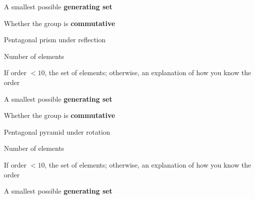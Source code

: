 \documentclass[../gatm_answers.tex]{subfiles}
\begin{document}
\begin{inner_problem}
\item A smallest possible \textbf{generating set}
\end{inner_problem}

\begin{inner_problem}
\item Whether the group is \textbf{commutative}
\end{inner_problem}

\begin{outer_problem}
\item Pentagonal prism under reflection
\end{outer_problem}

\begin{inner_problem}[start=1]
\item Number of elements
\end{inner_problem}

\begin{inner_problem}
\item If order $< 10$, the set of elements; otherwise, an explanation of how you know the order
\end{inner_problem}

\begin{inner_problem}
\item A smallest possible \textbf{generating set}
\end{inner_problem}

\begin{inner_problem}
\item Whether the group is \textbf{commutative}
\end{inner_problem}

\begin{outer_problem}
\item Pentagonal pyramid under rotation
\end{outer_problem}

\begin{inner_problem}[start=1]
\item Number of elements
\end{inner_problem}

\begin{inner_problem}
\item If order $< 10$, the set of elements; otherwise, an explanation of how you know the order
\end{inner_problem}

\begin{inner_problem}
\item A smallest possible \textbf{generating set}
\end{inner_problem}
\end{document}
